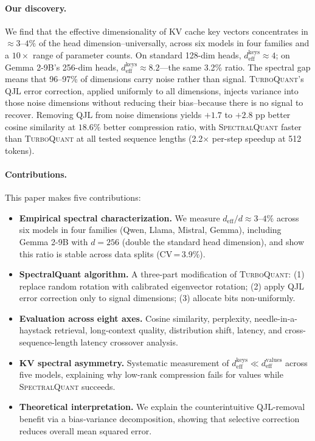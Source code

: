 \documentclass[11pt]{article}
\newcommand{\deff}{d_{\mathrm{eff}}}
\newcommand{\TQ}{\textsc{TurboQuant}}
\newcommand{\SQ}{\textsc{SpectralQuant}}
\begin{document}
\paragraph{Our discovery.}
We find that the effective dimensionality of KV cache key vectors concentrates
in $\approx 3$--$4\%$ of the head dimension--universally, across six models in
four families and a $10\times$ range of parameter counts.  On standard 128-dim
heads, $\deff^{\mathrm{keys}} \approx 4$; on Gemma 2-9B's 256-dim heads,
$\deff^{\mathrm{keys}} \approx 8.2$---the same 3.2\% ratio.  The spectral gap
means that 96--97\% of dimensions carry noise rather than signal.  \TQ{}'s
QJL error correction, applied uniformly to all dimensions, injects variance
into those noise dimensions without reducing their bias--because there is no
signal to recover.  Removing QJL from noise dimensions yields $+1.7$ to
$+2.8$ pp better cosine similarity at $18.6\%$ better compression ratio, with
\SQ{} faster than \TQ{} at all tested sequence lengths (2.2$\times$ per-step
speedup at 512 tokens).

\paragraph{Contributions.}  This paper makes five contributions:
\begin{itemize}[leftmargin=2em]
\item \textbf{Empirical spectral characterization.}  We measure $\deff/d
  \approx 3\text{--}4\%$ across six models in four families (Qwen, Llama,
  Mistral, Gemma), including Gemma 2-9B with $d = 256$ (double the
  standard head dimension), and show this ratio is stable across data
  splits (CV\,=\,3.9\%).
\item \textbf{SpectralQuant algorithm.}  A three-part modification of \TQ{}:
  (1) replace random rotation with calibrated eigenvector rotation; (2) apply
  QJL error correction only to signal dimensions; (3) allocate bits
  non-uniformly.
\item \textbf{Evaluation across eight axes.}  Cosine
  similarity, perplexity, needle-in-a-haystack retrieval, long-context
  quality, distribution shift, latency, and
  cross-sequence-length latency crossover analysis.
\item \textbf{KV spectral asymmetry.}  Systematic measurement of
  $\deff^{\mathrm{keys}} \ll \deff^{\mathrm{values}}$ across five models,
  explaining why low-rank compression fails for values while \SQ{} succeeds.
\item \textbf{Theoretical interpretation.}  We explain the counterintuitive
  QJL-removal benefit via a bias-variance decomposition, showing that
  selective correction reduces overall mean squared error.
\end{itemize}
\end{document}
